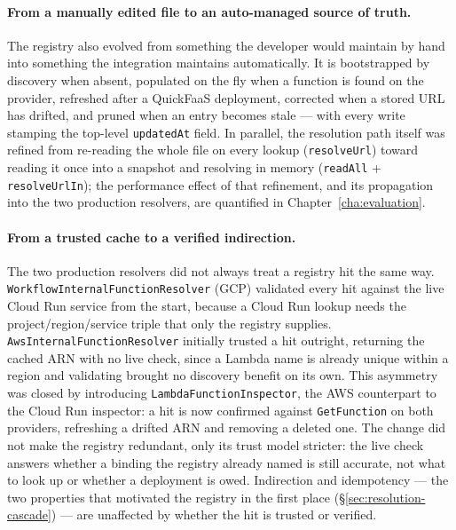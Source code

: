 \paragraph{From a manually edited file to an auto-managed source of truth.}
The registry also evolved from something the developer would maintain by hand into something the
integration maintains automatically. It is bootstrapped by discovery when absent, populated on the
fly when a function is found on the provider, refreshed after a QuickFaaS deployment, corrected when
a stored URL has drifted, and pruned when an entry becomes stale --- with every write stamping the
top-level \texttt{updatedAt} field. In parallel, the resolution path itself was refined from
re-reading the whole file on every lookup (\texttt{resolveUrl}) toward reading it once into a
snapshot and resolving in memory (\texttt{readAll} + \texttt{resolveUrlIn}); the performance effect
of that refinement, and its propagation into the two production resolvers, are quantified in
Chapter~\ref{cha:evaluation}.

\paragraph{From a trusted cache to a verified indirection.}
The two production resolvers did not always treat a registry hit the same way.
\texttt{Workflow\allowbreak Internal\allowbreak Function\allowbreak Resolver} (GCP) validated every hit against the live
Cloud Run service from the start, because a Cloud Run lookup needs the project/region/service
triple that only the registry supplies. \texttt{Aws\allowbreak Internal\allowbreak Function\allowbreak Resolver} initially
trusted a hit outright, returning the cached ARN with no live check, since a Lambda name is
already unique within a region and validating brought no discovery benefit on its own. This
asymmetry was closed by introducing \texttt{Lambda\allowbreak Function\allowbreak Inspector}, the AWS counterpart to
the Cloud Run inspector: a hit is now confirmed against \texttt{GetFunction} on both providers,
refreshing a drifted ARN and removing a deleted one. The change did not make the registry
redundant, only its trust model stricter: the live check answers whether a binding the registry
already named is still accurate, not what to look up or whether a deployment is owed. Indirection
and idempotency --- the two properties that motivated the registry in the first place
(\S\ref{sec:resolution-cascade}) --- are unaffected by whether the hit is trusted or verified.

